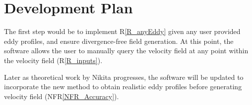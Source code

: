 \documentclass[12pt]{article}
\newcommand{\rref}[1]{R\ref{#1}}
\newcommand{\nfrref}[1]{NFR\ref{#1}}
\begin{document}



\section{Development Plan} \label{Sec_plan}

The first step would be to implement \rref{R_anyEddy} given any user provided eddy profiles, and ensure divergence-free field generation. At this point, the software allows the user to manually query the velocity field at any point within the velocity field (\rref{R_inputs}). 

Later as theoretical work by Nikita progresses, the software will be updated to incorporate the new method to obtain realistic eddy profiles before generating velocity field (\nfrref{NFR_Accuracy}).


\end{document}
